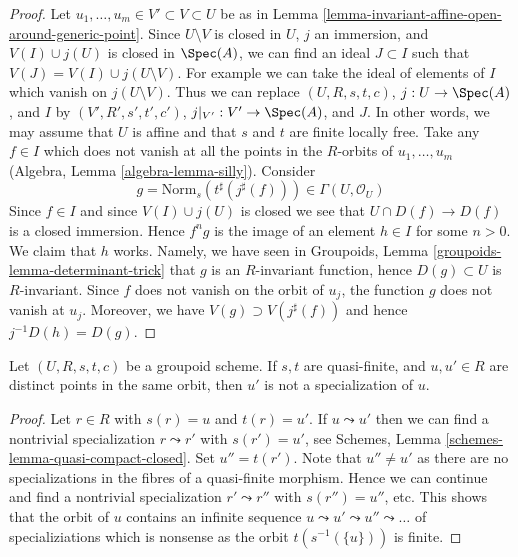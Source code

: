 \begin{proof}
Let $u_1, \ldots, u_m \in V' \subset V \subset U$ be as in
Lemma \ref{lemma-invariant-affine-open-around-generic-point}.
Since $U \setminus V$ is closed in $U$, $j$ an immersion, and $V(I) \cup j(U)$
is closed in $\Spec(A)$, we can find an ideal
$J \subset I$ such that $V(J) = V(I) \cup j(U \setminus V)$.
For example we can take the ideal of elements of $I$ which
vanish on $j(U \setminus V)$. Thus we can replace
$(U, R, s, t, c)$, $j : U \to \Spec(A)$, and $I$ by
$(V', R', s', t', c')$, $j|_{V'} : V' \to \Spec(A)$, and $J$.
In other words, we may assume that $U$ is affine and that
$s$ and $t$ are finite locally free.
Take any $f \in I$ which does not vanish at all the
points in the $R$-orbits of $u_1, \ldots, u_m$
(Algebra, Lemma \ref{algebra-lemma-silly}). Consider
$$
g = \text{Norm}_s(t^\sharp(j^\sharp(f))) \in \Gamma(U, \mathcal{O}_U)
$$
Since $f \in I$ and since $V(I) \cup j(U)$ is closed we see that
$U \cap D(f) \to D(f)$ is a closed immersion. Hence $f^ng$ is the
image of an element $h \in I$ for some $n > 0$. We claim that $h$ works.
Namely, we have seen in
Groupoids, Lemma \ref{groupoids-lemma-determinant-trick}
that $g$ is an $R$-invariant function, hence $D(g) \subset U$
is $R$-invariant. Since $f$ does not vanish on the orbit of $u_j$,
the function $g$ does not vanish at $u_j$. Moreover, we have
$V(g) \supset V(j^\sharp(f))$ and hence $j^{-1}D(h) = D(g)$.
\end{proof}

\begin{lemma}
\label{lemma-no-specializations-map-to-same-point}
Let $(U, R, s, t, c)$ be a groupoid scheme. If $s, t$ are quasi-finite,
and $u, u' \in R$ are distinct points in the same orbit,
then $u'$ is not a specialization of $u$.
\end{lemma}

\begin{proof}
Let $r \in R$ with $s(r) = u$ and $t(r) = u'$. If $u \leadsto u'$
then we can find a nontrivial specialization $r \leadsto r'$ with
$s(r') = u'$, see 
Schemes, Lemma \ref{schemes-lemma-quasi-compact-closed}.
Set $u'' = t(r')$. Note that $u'' \not = u'$ as there are no
specializations in the fibres of a quasi-finite morphism.
Hence we can continue and find a nontrivial specialization
$r' \leadsto r''$ with $s(r'') = u''$, etc. This shows that the
orbit of $u$ contains an infinite sequence
$u \leadsto u' \leadsto u'' \leadsto \ldots$
of specializiations which is nonsense as the orbit
$t(s^{-1}(\{u\}))$ is finite.
\end{proof}

